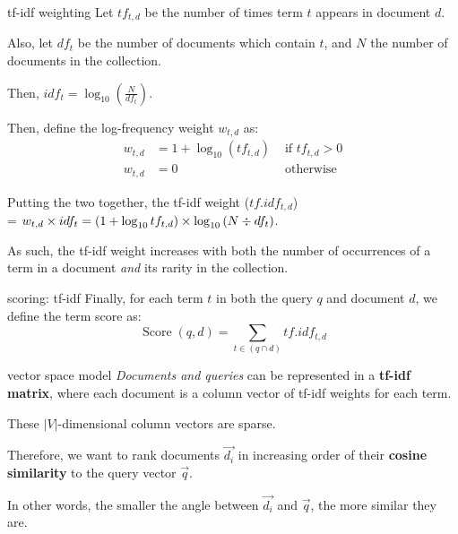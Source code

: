 \begin{defn}{tf-idf weighting}
    Let $tf_{t, d}$ be the number of times term $t$ appears in document $d$.

    Also, let $df_t$ be the number of documents which contain $t$, and
    $N$ the number of documents in the collection.

    Then, $idf_t = \log_{10}\left(\frac{N}{df_t}\right)$.

    Then, define the log-frequency weight $w_{t,d}$ as:\vspace{0.5em}
    \begin{align*}
        w_{t, d} & = 1 + \log_{10}(tf_{t, d}) & \text{ if } tf_{t, d} > 0 \\
        w_{t, d} & = 0                        & \text{ otherwise }
    \end{align*}

    Putting the two together, the tf-idf weight ($tf.idf_{t,d}$) \\
    = $w_{t, d} \times idf_t \\
        = \left(1 + \log_{10}tf_{t, d}\right) \times \log_{10}\left(N \div df_t\right)$.
\end{defn}

As such, the tf-idf weight increases with both the number of occurrences of a term in a document \textit{and} its rarity in the collection.

\begin{defn}{scoring: tf-idf}
    Finally, for each term $t$ in both the query $q$ and document $d$, we define the term score as: \vspace{0.8em}
    \[ \operatorname*{Score}(q, d) = \sum_{t \in (q \cap d)} tf.idf_{t,d} \]
\end{defn}

\begin{defn}{vector space model}
    \textit{Documents and queries} can be represented in a \textbf{tf-idf matrix}, where each document is a column vector of tf-idf weights for each term.

    These $|V|$-dimensional column vectors are sparse.
\end{defn}

Therefore, we want to rank documents $\overrightarrow{d_i}$ in increasing order of their \textbf{cosine similarity} to the query vector $\overrightarrow{q}$.

In other words, the smaller the angle between $\overrightarrow{d_i}$ and $\overrightarrow{q}$, the more similar they are.

